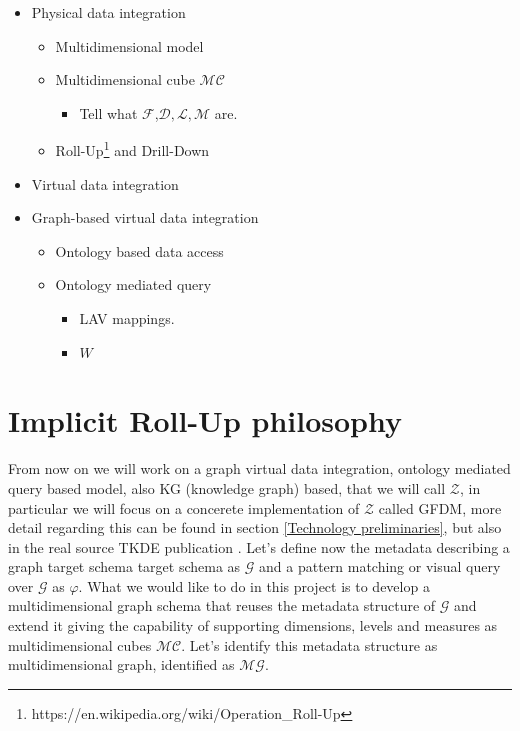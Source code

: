 \documentclass[12pt,a4paper]{report}
\newcommand\systemModel{\mathcal{Z}}
\newcommand\systemName{GFDM}
\newcommand\globalQuery{\varphi}
\newcommand\targetGraph{\mathcal{G}}
\newcommand\wrapper{W}
\newcommand\multidimensionalCube{\mathcal{MC}}
\newcommand\fact{\mathcal{F}}
\newcommand\dimension{\mathcal{D}}
\newcommand\level{\mathcal{L}}
\newcommand\measure{\mathcal{M}}
\newcommand\multidimensionalGraph{\mathcal{MG}}
\begin{document}
\begin{itemize}
    \item Physical data integration
    \begin{itemize}
        \item Multidimensional model
        \item Multidimensional cube $\multidimensionalCube$
        \begin{itemize}
            \item Tell what $\fact$,$\dimension, \level, \measure$ are.
        \end{itemize}
        \item Roll-Up\footnote{https://en.wikipedia.org/wiki/Operation_Roll-Up} and Drill-Down
    \end{itemize}
    \item Virtual data integration
    \item Graph-based virtual data integration
    \begin{itemize}
        \item Ontology based data access
        \item Ontology mediated query
        \begin{itemize}
            \item LAV mappings.
            \item $\wrapper$
        \end{itemize}
    \end{itemize}
\end{itemize}

\section{Implicit Roll-Up philosophy}
From now on we will work on a graph virtual data integration, ontology mediated query based model, also KG (knowledge graph) based, that we will call $\systemModel$, in particular we will focus on a concerete implementation of $\systemModel$ called \systemName, more detail regarding this can be found in section \ref{Technology preliminaries}, but also in the real source TKDE publication \cite{TKDE}.
%
Let's define now the metadata describing a graph target schema target schema as $\targetGraph$ and a pattern matching or visual query over $\targetGraph$ as $\globalQuery$.
%
What we would like to do in this project is to develop a multidimensional graph schema that reuses the metadata structure of $\targetGraph$ and extend it giving the capability of supporting dimensions, levels and measures as multidimensional cubes $\multidimensionalCube$.
%
Let's identify this metadata structure as multidimensional graph, identified as $\multidimensionalGraph$.
\end{document}

